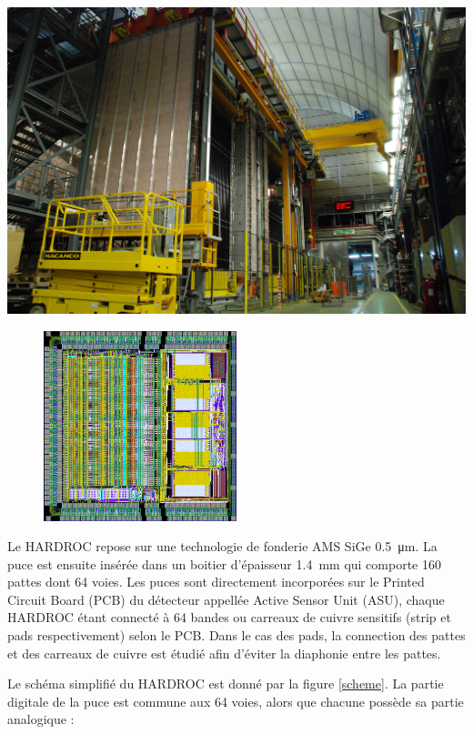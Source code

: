 \marginpar
{
	\centering
	\includegraphics[width=\marginparwidth]{GLA/OPERA.jpg}
	\label{opera}
}

\begin{figure}[ht!]
	\centering
	\includegraphics[width=0.5\textwidth]{GLA/HARDROC.png}
	\label{hardroc}
\end{figure}

Le HARDROC repose sur une technologie de fonderie AMS SiGe \SI{0.5}{\micro\meter}. La puce est ensuite insérée dans un boitier d'épaisseur \SI{1.4}{\milli\meter} qui comporte \num{160} pattes dont \num{64} voies. Les puces sont directement incorporées sur le Printed Circuit Board (PCB) du détecteur appellée Active Sensor Unit (ASU), chaque HARDROC étant connecté à \num{64} bandes ou carreaux de cuivre sensitifs (strip et pads respectivement) selon le PCB. Dans le cas des pads, la connection des pattes et des carreaux de cuivre est étudié afin d'éviter la diaphonie entre les pattes.

Le schéma simplifié du HARDROC est donné par la figure \ref{scheme}. La partie digitale de la puce est commune aux \num{64} voies, alors que chacune possède sa partie analogique :

